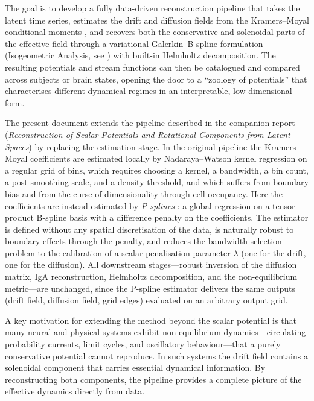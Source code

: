 \documentclass[11pt,a4paper]{article}
\begin{document}
The goal is to develop a fully data-driven reconstruction pipeline that takes
the latent time series, estimates the drift and diffusion fields from the
Kramers--Moyal conditional moments \cite{risken1989}, and recovers both the
conservative and solenoidal parts of the effective field through a variational
Galerkin--B-spline formulation (Isogeometric Analysis, see
\cite{cottrell2009}) with built-in Helmholtz decomposition. The resulting
potentials and stream functions can then be catalogued and compared across
subjects or brain states, opening the door to a ``zoology of potentials'' that
characterises different dynamical regimes in an interpretable, low-dimensional
form.

The present document extends the pipeline described in the companion report
(\emph{Reconstruction of Scalar Potentials and Rotational Components from
Latent Spaces}) by replacing the estimation stage. In the original pipeline the
Kramers--Moyal coefficients are estimated locally by Nadaraya--Watson kernel
regression on a regular grid of bins, which requires choosing a kernel, a
bandwidth, a bin count, a post-smoothing scale, and a density threshold, and
which suffers from boundary bias and from the curse of dimensionality through
cell occupancy. Here the coefficients are instead estimated by
\emph{P-splines} \cite{eilers1996}: a global regression on a tensor-product
B-spline basis with a difference penalty on the coefficients. The estimator is
defined without any spatial discretisation of the data, is naturally robust to
boundary effects through the penalty, and reduces the bandwidth selection
problem to the calibration of a scalar penalisation parameter $\lambda$ (one
for the drift, one for the diffusion). All downstream stages---robust
inversion of the diffusion matrix, IgA reconstruction, Helmholtz decomposition,
and the non-equilibrium metric---are unchanged, since the P-spline estimator
delivers the same outputs (drift field, diffusion field, grid edges) evaluated
on an arbitrary output grid.

A key motivation for extending the method beyond the scalar potential is that
many neural and physical systems exhibit non-equilibrium dynamics---circulating
probability currents, limit cycles, and oscillatory behaviour---that a purely
conservative potential cannot reproduce. In such systems the drift field
contains a solenoidal component that carries essential dynamical information.
By reconstructing both components, the pipeline provides a complete picture of
the effective dynamics directly from data.
\end{document}
